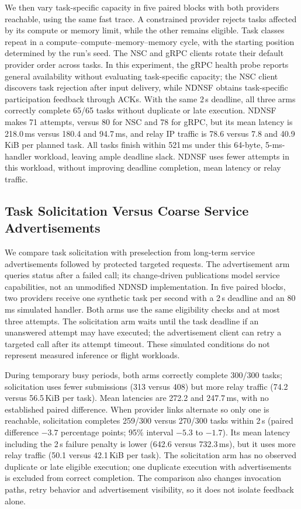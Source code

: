 We then vary task-specific capacity in five paired blocks with both providers reachable, using the same fast trace. A constrained provider rejects tasks affected by its compute or memory limit, while the other remains eligible. Task classes repeat in a compute--compute--memory--memory cycle, with the starting position determined by the run's seed. The NSC and gRPC clients rotate their default provider order across tasks. In this experiment, the gRPC health probe reports general availability without evaluating task-specific capacity; the NSC client discovers task rejection after input delivery, while NDNSF obtains task-specific participation feedback through ACKs. With the same 2\,s deadline, all three arms correctly complete 65/65 tasks without duplicate or late execution. NDNSF makes 71 attempts, versus 80 for NSC and 78 for gRPC, but its mean latency is 218.0\,ms versus 180.4 and 94.7\,ms, and relay IP traffic is 78.6 versus 7.8 and 40.9\,KiB per planned task. All tasks finish within 521\,ms under this 64-byte, 5-ms-handler workload, leaving ample deadline slack. NDNSF uses fewer attempts in this workload, without improving deadline completion, mean latency or relay traffic.

\subsection{Task Solicitation Versus Coarse Service Advertisements}
\label{sec:dynamic-selection-cost}

We compare task solicitation with preselection from long-term service advertisements followed by protected targeted requests. The advertisement arm queries status after a failed call; its change-driven publications model service capabilities, not an unmodified NDNSD implementation. In five paired blocks, two providers receive one synthetic task per second with a 2\,s deadline and an 80\,ms simulated handler. Both arms use the same eligibility checks and at most three attempts. The solicitation arm waits until the task deadline if an unanswered attempt may have executed; the advertisement client can retry a targeted call after its attempt timeout. These simulated conditions do not represent measured inference or flight workloads.

During temporary busy periods, both arms correctly complete 300/300 tasks; solicitation uses fewer submissions (313 versus 408) but more relay traffic (74.2 versus 56.5\,KiB per task). Mean latencies are 272.2 and 247.7\,ms, with no established paired difference. When provider links alternate so only one is reachable, solicitation completes 259/300 versus 270/300 tasks within 2\,s (paired difference $-3.7$ percentage points; 95\% interval $-5.3$ to $-1.7$). Its mean latency including the 2\,s failure penalty is lower (642.6 versus 732.3\,ms), but it uses more relay traffic (50.1 versus 42.1\,KiB per task). The solicitation arm has no observed duplicate or late eligible execution; one duplicate execution with advertisements is excluded from correct completion. The comparison also changes invocation paths, retry behavior and advertisement visibility, so it does not isolate feedback alone.



